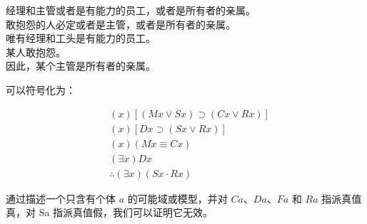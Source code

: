 经理和主管或者是有能力的员工，或者是所有者的亲属。\\
敢抱怨的人必定或者是主管，或者是所有者的亲属。\\
唯有经理和工头是有能力的员工。\\
某人敢抱怨。\\
因此，某个主管是所有者的亲属。

可以符号化为：

$$
\begin{aligned}
& (x)[(M x \vee S x) \supset(C x \vee R x)] \\
& (x)[D x \supset(S x \vee R x)] \\
& (x)(M x \equiv C x) \\
& (\exists x) D x \\
& \therefore(\exists x)(S x \cdot R x)
\end{aligned}
$$

通过描述一个只含有个体 $a$ 的可能域或模型，并对 $C a 、 D a 、 F a$ 和 $R a$ 指派真值真，对 Sa 指派真值假，我们可以证明它无效。 
